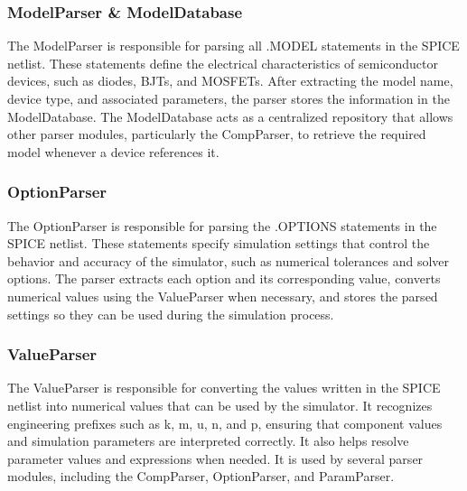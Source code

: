 \subsubsection{ModelParser \& ModelDatabase}
The ModelParser is responsible for parsing all .MODEL statements in the SPICE netlist. These statements define the electrical characteristics of semiconductor devices, such as diodes, BJTs, and MOSFETs. After extracting the model name, device type, and associated parameters, the parser stores the information in the ModelDatabase. The ModelDatabase acts as a centralized repository that allows other parser modules, particularly the CompParser, to retrieve the required model whenever a device references it.

\subsubsection{OptionParser}
The OptionParser is responsible for parsing the .OPTIONS statements in the SPICE netlist. These statements specify simulation settings that control the behavior and accuracy of the simulator, such as numerical tolerances and solver options. The parser extracts each option and its corresponding value, converts numerical values using the ValueParser when necessary, and stores the parsed settings so they can be used during the simulation process.

\subsubsection{ValueParser}
The ValueParser is responsible for converting the values written in the SPICE netlist into numerical values that can be used by the simulator. It recognizes engineering prefixes such as k, m, u, n, and p, ensuring that component values and simulation parameters are interpreted correctly. It also helps resolve parameter values and expressions when needed. It is used by several parser modules, including the CompParser, OptionParser, and ParamParser.

